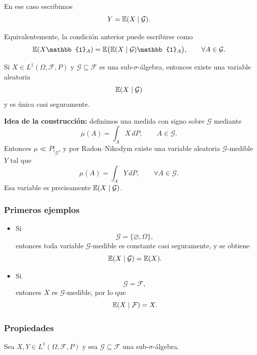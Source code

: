 En ese caso escribimos
\[
Y=\mathbb{E}(X\mid\mathcal{G}).
\]

Equivalentemente, la condición anterior puede escribirse como
\[
\E(X\mathbb{1}_A)=\E\big(\E(X\mid\mathcal{G})\mathbb{1}_A\big),
\qquad \forall A\in\mathcal{G}.
\]

\begin{teo}
Si \(X\in L^1(\Omega,\mathcal{F},P)\) y \(\mathcal{G}\subseteq\mathcal{F}\) es una sub-\(\sigma\)-álgebra, entonces existe una variable aleatoria
\[
\mathbb{E}(X\mid\mathcal{G})
\]
y es única casi seguramente.
\end{teo}

\medskip

\noindent
\textbf{Idea de la construcción:} definimos una medida con signo sobre \(\mathcal{G}\) mediante
\[
\mu(A)=\int_A X\,dP, \qquad A\in\mathcal{G}.
\]
Entonces \(\mu\ll P|_{\mathcal{G}}\), y por Radon--Nikodym existe una variable aleatoria \(\mathcal{G}\)-medible \(Y\) tal que
\[
\mu(A)=\int_A Y\,dP, \qquad \forall A\in\mathcal{G}.
\]
Esa variable es precisamente \(\mathbb{E}(X\mid\mathcal{G})\).

\subsubsection*{Primeros ejemplos}

\begin{itemize}
\item Si
\[
\mathcal{G}=\{\varnothing,\Omega\},
\]
entonces toda variable \(\mathcal{G}\)-medible es constante casi seguramente, y se obtiene
\[
\mathbb{E}(X\mid\mathcal{G})=\mathbb{E}(X).
\]

\item Si
\[
\mathcal{G}=\mathcal{F},
\]
entonces \(X\) es \(\mathcal{G}\)-medible, por lo que
\[
\mathbb{E}(X\mid\mathcal{F})=X.
\]
\end{itemize}

\subsubsection*{Propiedades}

Sea \(X,Y\in L^1(\Omega,\mathcal{F},P)\) y sea \(\mathcal{G}\subseteq\mathcal{F}\) una sub-\(\sigma\)-álgebra.

